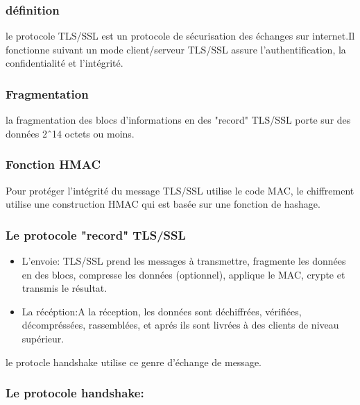 \subsubsection{définition}
le protocole TLS/SSL est un protocole de sécurisation des échanges sur internet.Il fonctionne suivant un mode client/serveur
TLS/SSL assure l'authentification, la confidentialité et l'intégrité.
\subsubsection{Fragmentation}
la fragmentation des blocs d'informations en des "record" TLS/SSL porte sur des données 2\^\ 14 octets ou moins.
\subsubsection{Fonction HMAC}
Pour protéger l'intégrité du message TLS/SSL utilise le code MAC,
le chiffrement utilise une construction HMAC qui est basée sur une fonction de hashage.
\subsubsection{Le protocole "record" TLS/SSL}
\begin{itemize}
\item L'envoie:
TLS/SSL prend les messages à transmettre, fragmente les données en des blocs, compresse les données (optionnel), applique le MAC, crypte et transmis le résultat. 
\item
La récéption:A la réception, les données sont déchiffrées, vérifiées, décompréssées, rassemblées, et aprés ils sont livrées à des clients de niveau supérieur.
\end{itemize}
le protocle handshake utilise ce genre d'échange de message.
\subsubsection{Le protocole handshake:}

